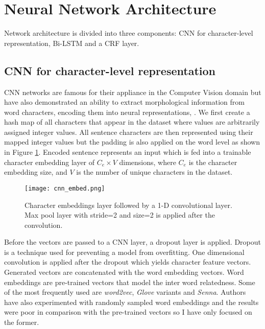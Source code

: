 \section{Neural Network Architecture}
Network architecture is divided into three components: CNN for character-level
representation, Bi-LSTM and a CRF layer.

\subsection{CNN for character-level representation}
CNN networks are famous for their appliance in the Computer Vision domain but
have also demonstrated an ability to extract morphological information
from word characters, encoding them into neural
representations\cite{santos2014learning}, \cite{chiu2015named}.
We first create a hash map of all characters
that appear in the dataset where  values are arbitrarily assigned integer
values. All sentence characters are then represented using their
mapped integer values but the padding is also applied on the word level as
shown in Figure \ref{fig:cnn_embed}.
Encoded sentence represents an input which is fed into a trainable character embedding
layer of $C_e \times V$ dimensions, where $C_e$ is the character embedding size,
and $V$ is the number of unique characters in the dataset.

\begin{figure}
  \caption{Character embeddings layer followed by a 1-D convolutional layer.
  Max pool layer with stride=2 and size=2 is applied after the convolution.}
  \label{fig:cnn_embed}
  \centering
    \texttt{[image: cnn\_embed.png]}
\end{figure}

Before the vectors are passed to a CNN layer, a
dropout\cite{srivastava2014dropout} layer is
applied. Dropout is a technique used for preventing a model from
overfitting. One dimensional convolution is applied after the dropout which
yields character feature vectors. Generated vectors are concatenated with the word
embedding vectors. Word embeddings are pre-trained vectors
that model the inter word relatedness. Some of the most frequently used are
\textit{word2vec}\cite{mikolov2013distributed}, \textit{Glove}
variants\cite{pennington2014glove} and
\textit{Senna}\cite{collobert2011natural}. Authors have also experimented with randomly sampled word
embeddings and the results were poor in comparison with the pre-trained vectors
so I have only focused on the former.

